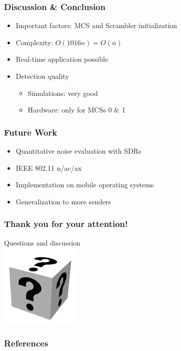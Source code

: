 \documentclass[accentcolor=tud8b,colorbacktitle]{tudbeamer}
\begin{document}
\begin{frame}
\frametitle{Discussion \& Conclusion}
\begin{itemize}
	\setlength\itemsep{1em}
	\item Important factors: MCS and Scrambler initialization
	\item Complexity: $ O(1016n) = O(n) $
	\item Real-time application possible
	\item Detection quality
	\begin{itemize}
		\setlength\itemsep{1em}
		\vspace{1em}
		\item Simulations: very good
		\item Hardware: only for MCSs 0 \& 1
	\end{itemize}
\end{itemize}
\end{frame}

	
\begin{frame}
\frametitle{Future Work}
\begin{itemize}
	\setlength\itemsep{1em}
	\item Quantitative noise evaluation with SDRs
	\item IEEE 802.11 n/ac/ax
	\item Implementation on mobile operating systems
	\item Generalization to more senders
\end{itemize}
\end{frame}


\begin{frame}
\frametitle{Thank you for your attention!}
\begin{center}
	\huge Questions and discussion\\
	\vspace{0,6cm}
	\includegraphics[height=4cm]{assets/faq}
\end{center}
\end{frame}


\begin{frame}[allowframebreaks]
\frametitle{References}


\end{frame}
\end{document}
